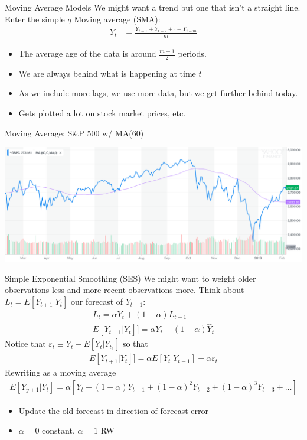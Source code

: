 \documentclass[aspectratio=169]{beamer}
\begin{document}
\begin{frame}{Moving Average Models}
 We might want a \alert{trend} but one that isn't a straight line.\\ Enter the simple $q$ Moving average (SMA):
\begin{align*}
Y_t &= \frac{Y_{t-1}+ Y_{t-2} + \cdot + Y_{t-m}}{m}
\end{align*}
\begin{itemize}
\item The average \alert{age} of the data is around $\frac{m+1}{2}$ periods.
\item We are always behind what is happening at time $t$
\item As we include more lags, we use more data, but we get further behind today.
\item Gets plotted a lot on stock market prices, etc.
\end{itemize}
\end{frame}

\begin{frame}{Moving Average: S\&P 500 w/ MA(60)}
\begin{center}
\includegraphics[width=5.5in]{./resources/sp-chart.png}
\end{center}
\end{frame}

\begin{frame}{Simple Exponential Smoothing (SES)}
We might want to weight older observations less and more recent observations more. Think about $L_t=E[Y_{t+1}|Y_t]$ our forecast of $Y_{t+1}$:
\begin{align*}
L_t = \alpha Y_t + (1-\alpha) L_{t-1}\\
E[Y_{t+1}|Y_t]] = \alpha Y_t + (1-\alpha) \hat{Y}_{t}
\end{align*}
Notice that $\varepsilon_t \equiv Y_t - E[Y_t| Y_{t_1}]$ so that
\begin{align*}
E[Y_{t+1}|Y_t]] = \alpha E[Y_t| Y_{t-1}] + \alpha \varepsilon_t
\end{align*}
Rewriting as a \alert{moving average}
\begin{align*}
E[Y_{y+1} | Y_t] = \alpha [ Y_t + (1-\alpha)Y_{t-1} + (1-\alpha)^2 Y_{t-2} + (1-\alpha)^3 Y_{t-3} + \ldots]
\end{align*}
\begin{itemize}
    \item Update the old forecast in direction of forecast error
    \item $\alpha=0$ constant, $\alpha=1$ RW
\end{itemize}
\end{frame}
\end{document}
